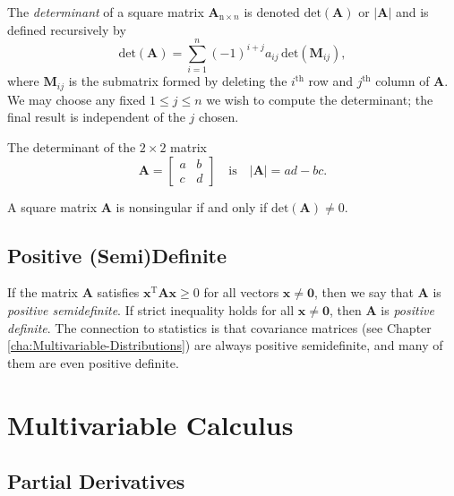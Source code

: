 \documentclass[captions=tableheading]{scrbook}
\begin{document}
\begin{defn}
The \emph{determinant} of a square matrix \(\mathbf{A}_{\mathrm{n}\times n}\) is denoted \(\mathrm{det}(\mathbf{A})\) or \(|\mathbf{A}|\) and is defined recursively by
\begin{equation}
\mathrm{det}(\mathbf{A})=\sum_{i=1}^{n}(-1)^{i+j}a_{ij}\,\mathrm{det}(\mathbf{M}_{ij}),
\end{equation}
where \(\mathbf{M}_{ij}\) is the submatrix formed by deleting the \(i^{\mathrm{th}}\) row and \(j^{\mathrm{th}}\) column of \(\mathbf{A}\). We may choose any fixed \(1\leq j\leq n\) we wish to compute the determinant; the final result is independent of the \(j\) chosen.
\end{defn}
\begin{fact}
The determinant of the \(2\times2\) matrix
\begin{equation}
\mathbf{A}=\begin{bmatrix}a & b\\
c & d\end{bmatrix}\quad\mbox{is}\quad|\mathbf{A}|=ad-bc.
\end{equation}
\end{fact}

\begin{fact}
A square matrix \(\mathbf{A}\) is nonsingular if and only if \(\mathrm{det}(\mathbf{A})\neq0\).
\end{fact}
\subsection{Positive (Semi)Definite}
\label{sec-21-5-3}

If the matrix \(\mathbf{A}\) satisfies \(\mathbf{x^{\mathrm{T}}}\mathbf{A}\mathbf{x}\geq0\) for all vectors \(\mathbf{x}\neq\mathbf{0}\), then we say that \(\mathbf{A}\) is \emph{positive semidefinite}. If strict inequality holds for all \(\mathbf{x}\neq\mathbf{0}\), then \(\mathbf{A}\) is \emph{positive definite}. The connection to statistics is that covariance matrices (see Chapter \ref{cha:Multivariable-Distributions}) are always positive semidefinite, and many of them are even positive definite.
\section{Multivariable Calculus \label{sec:Multivariable-Calculus}}
\label{sec-21-6}
\subsection{Partial Derivatives}
\label{sec-21-6-1}
\end{document}
